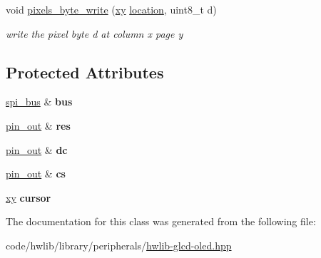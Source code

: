 \begin{DoxyCompactItemize}
\mbox{\label{classhwlib_1_1ssd1306__spi__res__dc__cs_a68c463efc6448039c9aae685faee4b5e}} 
void \hyperlink{classhwlib_1_1ssd1306__spi__res__dc__cs_a68c463efc6448039c9aae685faee4b5e}{pixels\+\_\+byte\+\_\+write} (\hyperlink{classhwlib_1_1xy}{xy} \hyperlink{classhwlib_1_1location}{location}, uint8\+\_\+t d)
\begin{DoxyCompactList}\small\item\em write the pixel byte d at column x page y \end{DoxyCompactList}\end{DoxyCompactItemize}
\subsection*{Protected Attributes}
\begin{DoxyCompactItemize}
\item 
\mbox{\label{classhwlib_1_1ssd1306__spi__res__dc__cs_ab9196615bbac54765a72120f09f2659a}} 
\hyperlink{classhwlib_1_1spi__bus}{spi\+\_\+bus} \& {\bfseries bus}
\item 
\mbox{\label{classhwlib_1_1ssd1306__spi__res__dc__cs_adf7fda24f1f06bd7682644ca88f0ad97}} 
\hyperlink{classhwlib_1_1pin__out}{pin\+\_\+out} \& {\bfseries res}
\item 
\mbox{\label{classhwlib_1_1ssd1306__spi__res__dc__cs_a1e12d81b255c3c124ce359085de570f8}} 
\hyperlink{classhwlib_1_1pin__out}{pin\+\_\+out} \& {\bfseries dc}
\item 
\mbox{\label{classhwlib_1_1ssd1306__spi__res__dc__cs_ac15bf3d2964a36188d74d337325b9590}} 
\hyperlink{classhwlib_1_1pin__out}{pin\+\_\+out} \& {\bfseries cs}
\item 
\mbox{\label{classhwlib_1_1ssd1306__spi__res__dc__cs_a8a9db144d2415bd10f67fa4d8f6845a8}} 
\hyperlink{classhwlib_1_1xy}{xy} {\bfseries cursor}
\end{DoxyCompactItemize}


The documentation for this class was generated from the following file\+:\begin{DoxyCompactItemize}
\item 
code/hwlib/library/peripherals/\hyperlink{library_2peripherals_2hwlib-glcd-oled_8hpp}{hwlib-\/glcd-\/oled.\+hpp}\end{DoxyCompactItemize}

